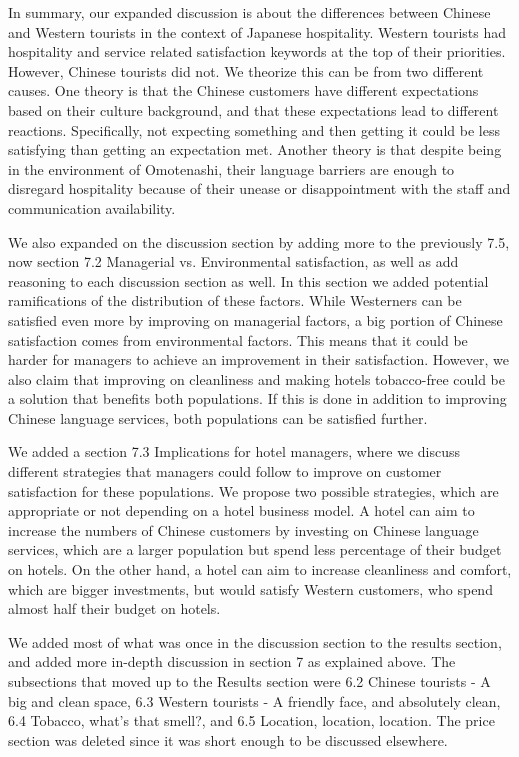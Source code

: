 \documentclass{letter}
\begin{document}
In summary, our expanded discussion is about the differences between Chinese and Western tourists in the context of Japanese hospitality. Western tourists had hospitality and service related satisfaction keywords at the top of their priorities. However, Chinese tourists did not. We theorize this can be from two different causes. One theory is that the Chinese customers have different expectations based on their culture background, and that these expectations lead to different reactions. Specifically, not expecting something and then getting it could be less satisfying than getting an expectation met. Another theory is that despite being in the environment of Omotenashi, their language barriers are enough to disregard hospitality because of their unease or disappointment with the staff and communication availability.

We also expanded on the discussion section by adding more to the previously 7.5, now section 7.2 Managerial vs. Environmental satisfaction, as well as add reasoning to each discussion section as well. In this section we added potential ramifications of the distribution of these factors. While Westerners can be satisfied even more by improving on managerial factors, a big portion of Chinese satisfaction comes from environmental factors. This means that it could be harder for managers to achieve an improvement in their satisfaction. However, we also claim that improving on cleanliness and making hotels tobacco-free could be a solution that benefits both populations. If this is done in addition to improving Chinese language services, both populations can be satisfied further.

We added a section 7.3 Implications for hotel managers, where we discuss different strategies that managers could follow to improve on customer satisfaction for these populations. We propose two possible strategies, which are appropriate or not depending on a hotel business model. A hotel can aim to increase the numbers of Chinese customers by investing on Chinese language services, which are a larger population but spend less percentage of their budget on hotels. On the other hand, a hotel can aim to increase cleanliness and comfort, which are bigger investments, but would satisfy Western customers, who spend almost half their budget on hotels.

We added most of what was once in the discussion section to the results section, and added more in-depth discussion in section 7 as explained above. The subsections that moved up to the Results section were 6.2 Chinese tourists - A big and clean space, 6.3 Western tourists - A friendly face, and absolutely clean, 6.4 Tobacco, what’s that smell?, and 6.5 Location, location, location. The price section was deleted since it was short enough to be discussed elsewhere.
\end{document}
